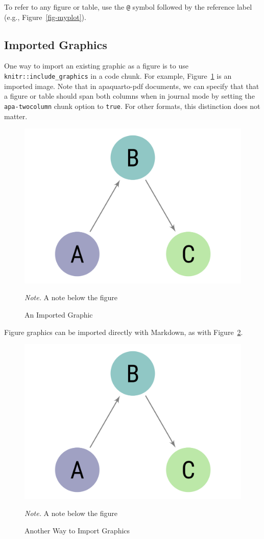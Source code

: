\documentclass[
  jou,
  floatsintext,
  longtable,
  nolmodern,
  notxfonts,
  notimes,
  colorlinks=true,linkcolor=blue,citecolor=blue,urlcolor=blue]{apa7}
\begin{document}
To refer to any figure or table, use the \texttt{@} symbol followed by
the reference label (e.g., Figure~\ref{fig-myplot}).

\subsection{Imported Graphics}\label{imported-graphics}

One way to import an existing graphic as a figure is to use
\texttt{knitr::include\_graphics} in a code chunk. For example,
Figure~\ref{fig-import1} is an imported image. Note that in
apaquarto-pdf documents, we can specify that that a figure or table
should span both columns when in journal mode by setting the
\texttt{apa-twocolumn} chunk option to \texttt{true}. For other formats,
this distinction does not matter.

\label{cell-fig-import1}
\begin{figure}[H]

{\caption{{An Imported Graphic}{\label{fig-import1}}}}

\includegraphics[width=0.48\linewidth,height=\textheight,keepaspectratio]{sampleimage.png}

{\noindent \emph{Note.} A note below the figure}

\end{figure}

Figure graphics can be imported directly with Markdown, as with
Figure~\ref{fig-import2}.

\begin{figure}[!htbp]

{\caption{{Another Way to Import Graphics}{\label{fig-import2}}}}

\includegraphics[width=0.49\linewidth,height=\textheight,keepaspectratio]{sampleimage.png}

{\noindent \emph{Note.} A note below the figure}

\end{figure}
\end{document}
